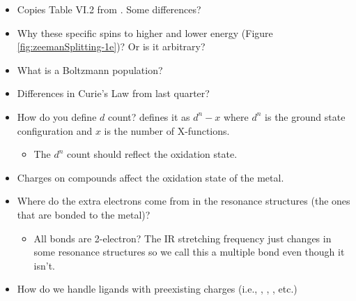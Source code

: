 \documentclass[../notes.tex]{subfiles}
\begin{document}
\begin{itemize}
    \item Copies Table VI.2 from \textcite{bib:CHEM20100Notes}. Some differences?
    \item Why these specific spins to higher and lower energy (Figure \ref{fig:zeemanSplitting-1e})? Or is it arbitrary?
    \item What is a Boltzmann population?
    \item Differences in Curie's Law from last quarter?
    \item How do you define $d$ count? \textcite{bib:CBC} defines it as $d^n-x$ where $d^n$ is the ground state configuration and $x$ is the number of X-functions.
    \begin{itemize}
        \item The $d^n$ count should reflect the oxidation state.
    \end{itemize}
    \item Charges on compounds affect the oxidation state of the metal.
    \item Where do the extra electrons come from in the  resonance structures (the ones that are bonded to the metal)?
    \begin{itemize}
        \item All  bonds are 2-electron? The IR stretching frequency just changes in some resonance structures so we call this a multiple  bond even though it isn't.
    \end{itemize}
    \item How do we handle ligands with preexisting charges (i.e., , , , etc.)
\end{itemize}
\end{document}
